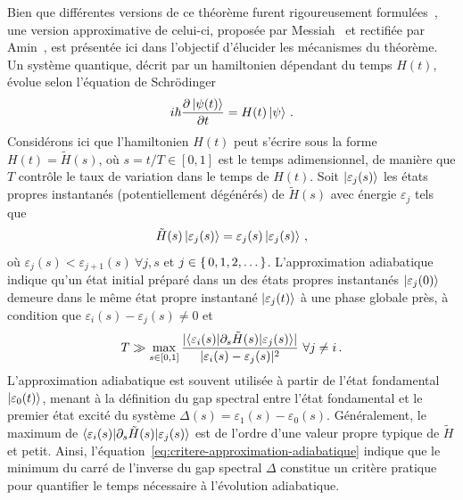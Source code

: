 Bien que différentes versions de ce théorème furent rigoureusement formulées~\cite{albashAdiabaticQuantumComputation2018}, une version approximative de celui-ci, proposée par Messiah~\cite{messiahQuantumMechanics1961} et rectifiée par Amin~\cite{aminConsistencyAdiabaticTheorem2009}, est présentée ici dans l'objectif d'élucider les mécanismes du théorème. Un système quantique, décrit par un hamiltonien dépendant du temps $H(t)$, évolue selon l'équation de Schrödinger
\begin{equation}
    i \hbar \frac{\partial \ket{\psi(t)}}{\partial t} = H(t) \ket{\psi} \,.
 \end{equation}
Considérons ici que l'hamiltonien $H(t)$ peut s'écrire sous la forme $H(t) = \tilde{H}(s)$, où $s=t/T \in [0,1]$ est le temps adimensionnel, de manière que $T$ contrôle le taux de variation dans le temps de $H(t)$. Soit $\ket{\varepsilon_{j} (s)}$ les états propres instantanés (potentiellement dégénérés) de $\tilde{H}(s)$ avec énergie $\varepsilon_{j}$ tels que
\begin{equation}
   \tilde{H}(s) \ket{\varepsilon_{j}(s)} = \varepsilon_{j}(s) \ket{\varepsilon_{j}(s)} \,,
\end{equation}
où $\varepsilon_{j}(s) < \varepsilon_{j+1}(s) \ \forall j,s$ et $j \in \set{ 0, 1, 2, \dots }$. L'approximation adiabatique indique qu'un état initial préparé dans un des états propres instantanés $\ket{\varepsilon_{j}(0)}$ demeure dans le même état propre instantané $\ket{\varepsilon_{j}(t)}$ à une phase globale près, à condition que $\varepsilon_{i}(s) - \varepsilon_{j}(s) \neq  0$ et
\begin{equation}
    \label{eq:critere-approximation-adiabatique}
    T \gg \max_{s \in [0,1]} \frac{\lvert \braket{ \varepsilon_{i}(s) | \partial_{s} \tilde{H}(s) | \varepsilon_{j}(s) } \rvert }{\lvert \varepsilon_{i}(s) - \varepsilon_{j}(s) \rvert^{2} } \ \forall j \neq i \,.
\end{equation}
L'approximation adiabatique est souvent utilisée à partir de l'état fondamental $\ket{\varepsilon_{0}(t)}$, menant à la définition du gap spectral entre l'état fondamental et le premier état excité du système $\Delta(s) = \varepsilon_{1}(s) - \varepsilon_{0}(s)$. Généralement, le maximum de $\braket{ \varepsilon_{i}(s) | \partial_{s} \tilde{H}(s) | \varepsilon_{j}(s)}$ est de l'ordre d'une valeur propre typique de $\tilde{H}$ et petit. Ainsi, l'équation~\ref{eq:critere-approximation-adiabatique} indique que le minimum du carré de l'inverse du gap spectral $\Delta$ constitue un critère pratique pour quantifier le temps nécessaire à l'évolution adiabatique.

